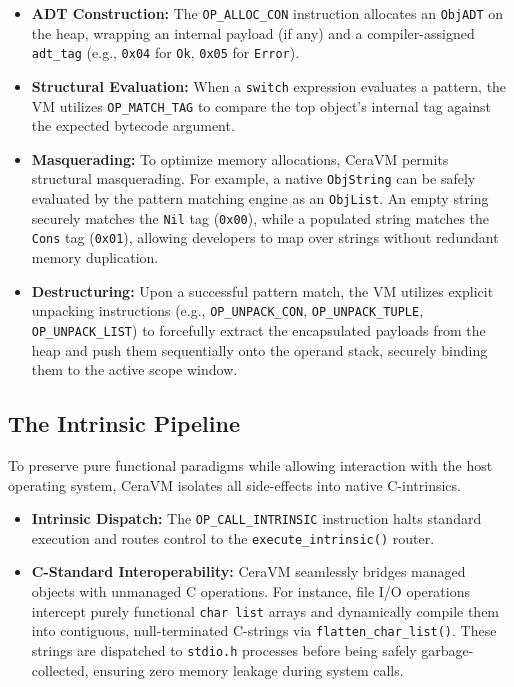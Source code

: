 \documentclass[11pt, a4paper]{article}
\begin{document}
\begin{itemize}
    \item \textbf{ADT Construction:} The \texttt{OP\_ALLOC\_CON} instruction allocates an \texttt{ObjADT} on the heap, wrapping an internal payload (if any) and a compiler-assigned \texttt{adt\_tag} (e.g., \texttt{0x04} for \texttt{Ok}, \texttt{0x05} for \texttt{Error}).
    \item \textbf{Structural Evaluation:} When a \texttt{switch} expression evaluates a pattern, the VM utilizes \texttt{OP\_MATCH\_TAG} to compare the top object's internal tag against the expected bytecode argument.
    \item \textbf{Masquerading:} To optimize memory allocations, CeraVM permits structural masquerading. For example, a native \texttt{ObjString} can be safely evaluated by the pattern matching engine as an \texttt{ObjList}. An empty string securely matches the \texttt{Nil} tag (\texttt{0x00}), while a populated string matches the \texttt{Cons} tag (\texttt{0x01}), allowing developers to map over strings without redundant memory duplication.
    \item \textbf{Destructuring:} Upon a successful pattern match, the VM utilizes explicit unpacking instructions (e.g., \texttt{OP\_UNPACK\_CON}, \texttt{OP\_UNPACK\_TUPLE}, \texttt{OP\_UNPACK\_LIST}) to forcefully extract the encapsulated payloads from the heap and push them sequentially onto the operand stack, securely binding them to the active scope window.
\end{itemize}

\subsection{The Intrinsic Pipeline}
\noindent
To preserve pure functional paradigms while allowing interaction with the host operating system, CeraVM isolates all side-effects into native C-intrinsics.

\begin{itemize}
    \item \textbf{Intrinsic Dispatch:} The \texttt{OP\_CALL\_INTRINSIC} instruction halts standard execution and routes control to the \texttt{execute\_intrinsic()} router.
    \item \textbf{C-Standard Interoperability:} CeraVM seamlessly bridges managed objects with unmanaged C operations. For instance, file I/O operations intercept purely functional \texttt{char list} arrays and dynamically compile them into contiguous, null-terminated C-strings via \texttt{flatten\_char\_list()}. These strings are dispatched to \texttt{stdio.h} processes before being safely garbage-collected, ensuring zero memory leakage during system calls.
\end{itemize}
\end{document}
